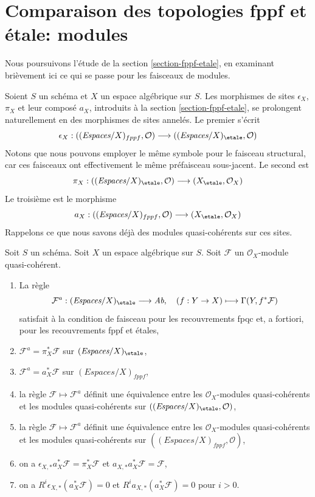 \section{Comparaison des topologies fppf et étale: modules}
\label{section-fppf-etale-modules}

\noindent
Nous poursuivons l'étude de la section \ref{section-fppf-etale}, en examinant
brièvement ici ce qui se passe pour les faisceaux de modules.

\medskip\noindent
Soient $S$ un schéma et $X$ un espace algébrique sur $S$.
Les morphismes de sites $\epsilon_X$, $\pi_X$ et leur composé $a_X$, introduits
à la section \ref{section-fppf-etale}, se prolongent naturellement en des
morphismes de sites annelés. Le premier s'écrit
$$
\epsilon_X :
((\textit{Espaces}/X)_{fppf}, \mathcal{O})
\longrightarrow
((\textit{Espaces}/X)_\etale, \mathcal{O})
$$
Notons que nous pouvons employer le même symbole pour le faisceau structural,
car ces faisceaux ont effectivement le même préfaisceau sous-jacent. Le second est
$$
\pi_X :
((\textit{Espaces}/X)_\etale, \mathcal{O})
\longrightarrow
(X_\etale, \mathcal{O}_X)
$$
Le troisième est le morphisme
$$
a_X :
((\textit{Espaces}/X)_{fppf}, \mathcal{O})
\longrightarrow
(X_\etale, \mathcal{O}_X)
$$
Rappelons ce que nous savons déjà des modules quasi-cohérents sur ces sites.

\begin{lemma}
\label{lemma-review-quasi-coherent}
Soit $S$ un schéma. Soit $X$ un espace algébrique sur $S$.
Soit $\mathcal{F}$ un $\mathcal{O}_X$-module quasi-cohérent.
\begin{enumerate}
\item La règle
$$
\mathcal{F}^a : (\textit{Espaces}/X)_\etale \longrightarrow \textit{Ab},\quad
(f : Y \to X) \longmapsto \Gamma(Y, f^*\mathcal{F})
$$
satisfait à la condition de faisceau pour les recouvrements fpqc et, a fortiori,
pour les recouvrements fppf et étales,
\item $\mathcal{F}^a = \pi_X^*\mathcal{F}$ sur $(\textit{Espaces}/X)_\etale$,
\item $\mathcal{F}^a = a_X^*\mathcal{F}$ sur $(\textit{Espaces}/X)_{fppf}$,
\item la règle $\mathcal{F} \mapsto \mathcal{F}^a$ définit une équivalence entre
les $\mathcal{O}_X$-modules quasi-cohérents et les modules quasi-cohérents sur
$((\textit{Espaces}/X)_\etale, \mathcal{O})$,
\item la règle $\mathcal{F} \mapsto \mathcal{F}^a$ définit une équivalence entre
les $\mathcal{O}_X$-modules quasi-cohérents et les modules quasi-cohérents sur
$((\textit{Espaces}/X)_{fppf}, \mathcal{O})$,
\item on a $\epsilon_{X, *}a_X^*\mathcal{F} = \pi_X^*\mathcal{F}$
et $a_{X, *}a_X^*\mathcal{F} = \mathcal{F}$,
\item on a $R^i\epsilon_{X, *}(a_X^*\mathcal{F}) = 0$
et $R^ia_{X, *}(a_X^*\mathcal{F}) = 0$ pour $i > 0$.
\end{enumerate}
\end{lemma}

